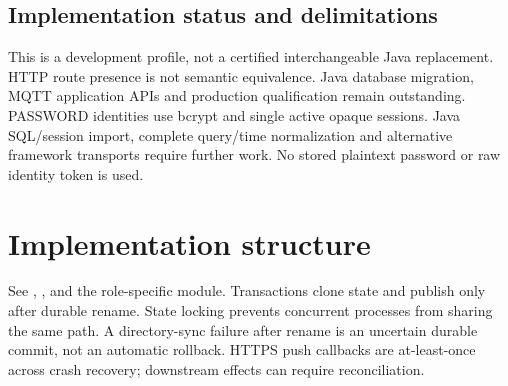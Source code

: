 \documentclass[a4paper]{arrowhead}
\begin{document}
\subsection{Implementation status and delimitations}
This is a development profile, not a certified interchangeable Java replacement. HTTP route presence is not semantic equivalence. Java database migration, MQTT application APIs and production qualification remain outstanding.
PASSWORD identities use bcrypt and single active opaque sessions. Java SQL/session import, complete query/time normalization and alternative framework transports require further work. No stored plaintext password or raw identity token is used.
\section{Implementation structure}
See , ,  and the role-specific module. Transactions clone state and publish only after durable rename. State locking prevents concurrent processes from sharing the same path. A directory-sync failure after rename is an uncertain durable commit, not an automatic rollback. HTTPS push callbacks are at-least-once across crash recovery; downstream effects can require reconciliation.
\end{document}
